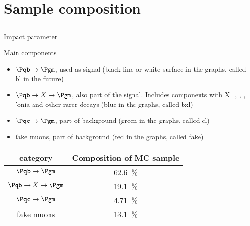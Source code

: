 \section{Sample composition}
\subsection{}

\begin{frame}{Impact parameter}
	\begin{block}{Main components}
		\begin{itemize}
			\item $\Pqb\to\Pgm$, used as signal (black line or white surface in the graphs, called bl in the future)
			\item $\Pqb\to X\to\Pgm$, also part of the signal. Includes components with X=\Pqc, \Paqc, \Pgt, 'onia and other rarer decays (blue in the graphs, called bxl)
			\item $\Pqc\to\Pgm$, part of background (green in the graphs, called cl)
			\item fake muons, part of background (red in the graphs, called fake)
		\end{itemize}
	\end{block}
	\centering
	\begin{tabular}{cc}
		category &	Composition of MC sample \\ \midrule
		$\Pqb\to\Pgm$ &	\SI{62.6}{\percent} \\
		$\Pqb\to X\to\Pgm$ &	\SI{19.1}{\percent} \\
		$\Pqc\to\Pgm$ &	\SI{4.71}{\percent} \\
		fake muons &	\SI{13.1}{\percent}
	\end{tabular}
\end{frame}
